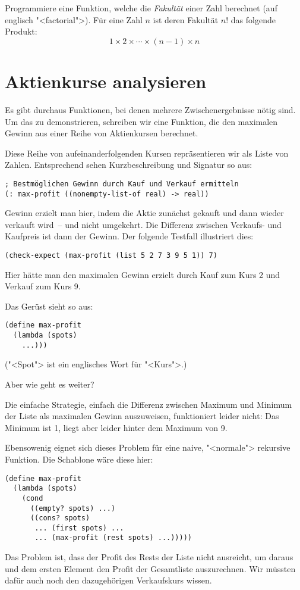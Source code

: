 \begin{aufgabeinline}
  Programmiere eine Funktion, welche die
  \textit{Fakultät} einer Zahl berechnet (auf englisch
  "<factorial">). Für eine Zahl $n$ ist deren Fakultät $n!$ das
  folgende Produkt: \[1\times 2\times \cdots \times (n-1)\times n\]
\end{aufgabeinline}

\section{Aktienkurse analysieren}

Es gibt durchaus Funktionen, bei denen mehrere Zwischenergebnisse
nötig sind.  Um das zu demonstrieren, schreiben wir eine Funktion, die
den maximalen Gewinn aus einer Reihe von Aktienkursen berechnet.

Diese Reihe von aufeinanderfolgenden Kursen repräsentieren wir als
Liste von Zahlen.  Entsprechend sehen Kurzbeschreibung und Signatur so
aus:
%
\begin{lstlisting}
; Bestmöglichen Gewinn durch Kauf und Verkauf ermitteln
(: max-profit ((nonempty-list-of real) -> real))
\end{lstlisting}
%
Gewinn erzielt man hier, indem die Aktie zunächst gekauft und dann
wieder verkauft wird~-- und nicht umgekehrt.  Die Differenz zwischen
Verkaufs- und Kaufpreis ist dann der Gewinn.  Der folgende Testfall
illustriert dies:
%
\begin{lstlisting}
(check-expect (max-profit (list 5 2 7 3 9 5 1)) 7)
\end{lstlisting}
%
Hier hätte man den maximalen Gewinn erzielt durch Kauf zum Kurs 2 und
Verkauf zum Kurs 9.

Das Gerüst sieht so aus:
%
\begin{lstlisting}
(define max-profit
  (lambda (spots)
    ...)))
\end{lstlisting}
%
("<Spot"> ist ein englisches Wort für "<Kurs">.)

Aber wie geht es weiter?

Die einfache Strategie, einfach die Differenz zwischen Maximum und
Minimum der Liste als maximalen Gewinn auszuweisen, funktioniert
leider nicht: Das Minimum ist 1, liegt aber leider hinter dem Maximum
von 9.

Ebensowenig eignet sich dieses Problem für eine naive, "<normale">
rekursive Funktion.  Die Schablone wäre diese hier:
%
\begin{lstlisting}
(define max-profit
  (lambda (spots)
    (cond
      ((empty? spots) ...)
      ((cons? spots)
       ... (first spots) ...
       ... (max-profit (rest spots) ...)))))
\end{lstlisting}
%
Das Problem ist, dass der Profit des Rests der Liste nicht ausreicht,
um daraus und dem ersten Element den Profit der Gesamtliste
auszurechnen.  Wir müssten dafür auch noch den dazugehörigen
Verkaufskurs wissen.

